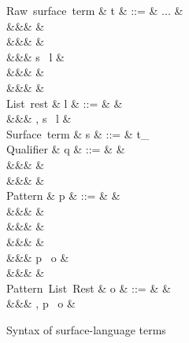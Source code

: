 \begin{figure}[H]
\begin{syntaxfig}
\mbox{Raw surface term}
&
t
&
::=
&
...
&
\\
&&&
&
\\
&&&
\sExNil
&
\\
&&&
\kw{\lbrack}s \ l
&
\\
&&&
&
\\
&&&
&
\\[2mm]

\mbox{List rest}
&
l
&
::=
&
\rbrack
&
\\
&&&
, s \ l
&
\\[2mm]

\mbox{Surface term}
&
s
&
::=
&
t_{\alpha}
\\[2mm]


\mbox{Qualifier}
&
q
&
::=
&
&
\\
&&&
&
\\
&&&
&
\\[2mm]


\mbox{Pattern}
&
p
&
::=
&
&
\\
&&&
\pattNil
&
\\
&&&
&
\\
&&&
\pattSNil
&
\\
&&&
\lbrack p \ o
&
\\
&&&
&
\\[2mm]

\mbox{Pattern List Rest}
&
o
&
::=
&
\rbrack
&
\\
&&&
, p \ o
&
\\[2mm]
\end{syntaxfig}
\caption{Syntax of surface-language terms}
\end{figure}


